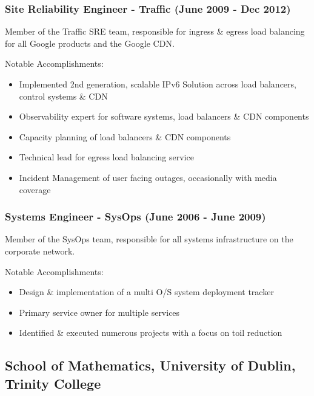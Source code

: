 \documentclass[a4paper, 10pt] {article}
\begin{document}
\subsubsection*{Site Reliability Engineer - Traffic (June 2009 - Dec 2012)}

Member of the Traffic SRE team, responsible for ingress \& egress load balancing for all Google products and the Google CDN. 

\vspace{3mm}  %

Notable Accomplishments:

\begin{itemize}
  \item Implemented 2nd generation, scalable IPv6 Solution across load balancers, control systems \& CDN
  \item Observability expert for software systems, load balancers \& CDN components
  \item Capacity planning of load balancers \& CDN components
  \item Technical lead for egress load balancing service
  \item Incident Management of user facing outages, occasionally with media coverage
\end{itemize}

\subsubsection*{Systems Engineer - SysOps (June 2006 - June 2009)}

Member of the SysOps team, responsible for all systems infrastructure on the corporate network.

\vspace{3mm}  %

Notable Accomplishments:

\begin{itemize}
  \item Design \& implementation of a multi O/S system deployment tracker
  \item Primary service owner for multiple services
  \item Identified \& executed numerous projects with a focus on toil reduction
\end{itemize}

\subsection*{School of Mathematics, University of Dublin, Trinity College}
\end{document}
